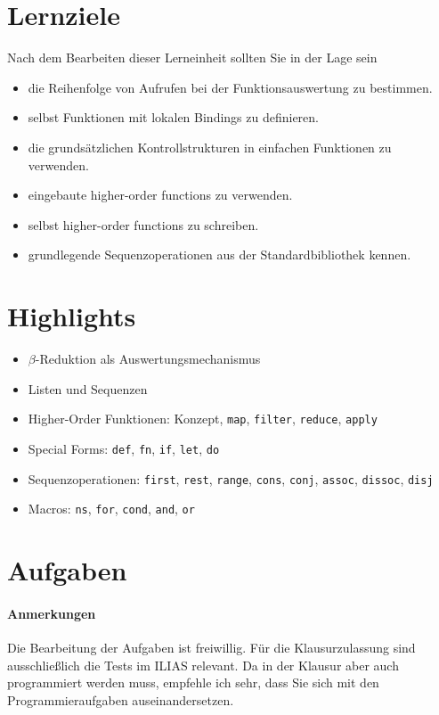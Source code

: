 \documentclass[11pt,a4paper]{article}
\theoremstyle{break}
\begin{document}
\section{Lernziele}

Nach dem Bearbeiten dieser Lerneinheit sollten Sie in der Lage sein

\begin{itemize}
    \item die Reihenfolge von Aufrufen bei der Funktionsauswertung zu bestimmen.
    \item selbst Funktionen mit lokalen Bindings zu definieren.
    \item die grunds\"atzlichen Kontrollstrukturen in einfachen Funktionen zu verwenden.
    \item eingebaute higher-order functions zu verwenden.
    \item selbst higher-order functions zu schreiben.
    \item grundlegende Sequenzoperationen aus der Standardbibliothek kennen.
\end{itemize}

\section{Highlights}

\begin{itemize}
    \item $\beta$-Reduktion als Auswertungsmechanismus
    \item Listen und Sequenzen
    \item Higher-Order Funktionen: Konzept, \verb|map|, \verb|filter|, \verb|reduce|, \verb|apply|
    \item Special Forms: \verb|def|, \verb|fn|, \verb|if|, \verb|let|, \verb|do|
    \item Sequenzoperationen: \verb|first|, \verb|rest|, \verb|range|, \verb|cons|, \verb|conj|, \verb|assoc|, \verb|dissoc|, \verb|disj|
    \item Macros: \verb|ns|, \verb|for|, \verb|cond|, \verb|and|, \verb|or|
\end{itemize}



\section{Aufgaben}

\paragraph{Anmerkungen}
Die Bearbeitung der Aufgaben ist freiwillig.
F\"ur die Klausurzulassung sind ausschlie\ss{}lich die Tests im ILIAS relevant.
Da in der Klausur aber auch programmiert werden muss,
empfehle ich sehr, dass Sie sich mit den Programmieraufgaben auseinandersetzen.
\end{document}
